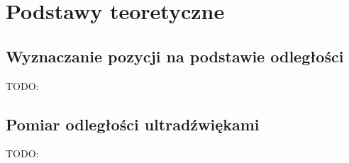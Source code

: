 \chapter{Podstawy teoretyczne}
\section{Wyznaczanie pozycji na podstawie odległości}
TODO:
\section{Pomiar odległości ultradźwiękami}
TODO: